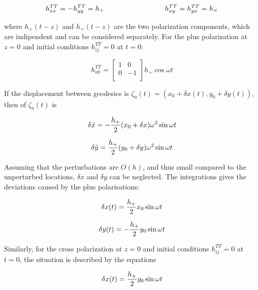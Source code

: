 \documentclass[binding=0.6cm, LaM]{sapthesis}
\begin{document}
		\begin{equation}
		h_{xx}^{TT} = - h_{yy}^{TT} = h_{+} \hspace*{3cm} h_{xy}^{TT} = h_{yx}^{TT} = h_{\times}
		\end{equation}

	where $h_{+}(t-z)$ and $h_{\times}(t-z)$ are the two polarization components, which are indipendent and can be considered separately.
	For the plus polarization at $z=0$ and initial conditions $h_{ij}^{TT} = 0$ at $t=0$:

		\begin{equation}
		h_{ab}^{TT} = 
		\begin{bmatrix}
		1  & 0 \\
		0 &  -1 \\
		\end{bmatrix} 
		h_{+}\cos \omega t
		\end{equation}

	If the displacement between geodesics is $\zeta_a (t) = (x_0 + \delta x(t), y_0 + \delta y(t))$, then of $\zeta_a (t)$ is

		\begin{equation}
		\delta {\ddot x} = - {{h_{+}} \over 2} (x_0 + \delta x) \omega ^2 \sin \omega t
		\end{equation}

		\begin{equation}
		\delta {\ddot y} =  {{h_{+}} \over 2} (y_0 + \delta y) \omega ^2 \sin \omega t
		\end{equation}

	Assuming that the perturbations are $O(h)$, and thus small compared to the unperturbed locations, $\delta x$ and $\delta y$ can be neglected.
	The integrations gives the deviations caused by the plus polarisations:

		\begin{equation}
		\delta x(t) =  {{h_{+}} \over 2} x_0 \sin \omega t
		\end{equation}

		\begin{equation}
		\delta y(t) = - {{h_{+}} \over 2} y_0  \sin \omega t
		\end{equation}

	Similarly, for the cross polarization at $z=0$ and initial conditions $h_{ij}^{TT} = 0$ at $t= 0$, the situation is described by the equations
		
		\begin{equation}
		\delta x(t) =  {{h_{\times}} \over 2} y_0 \sin \omega t
		\end{equation}
\end{document}
